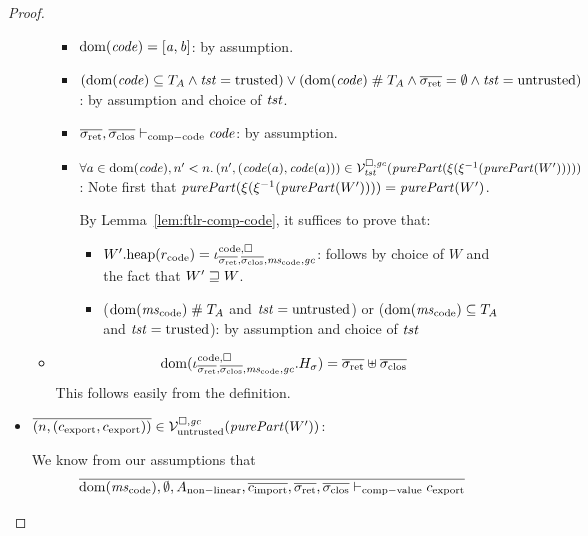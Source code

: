 \documentclass[a4paper]{article}
\begin{document}
\begin{proof}
\begin{itemize}
\begin{itemize}
      \begin{itemize}
      \item $\mathrm{dom}(\mathit{code}) = [\mathit{a},\mathit{b}]$: by assumption.
      \item $(\dom(\code) \subseteq \ta \wedge \trust = \trusted) \vee (\dom(\code)\mathrel{\#} \ta \wedge \sigrets = \emptyset \wedge \trust =\untrusted)$: by assumption and choice of $\mathit{tst}$.
      \item $\sigrets,\sigcloss \vdash_{\mathrm{comp-code}} \code$: by assumption.
      \item $\forall a \in \dom(\code), n' < n \ldotp \npair[n']{(\code(a),\code(a))} \in \lrvg{\trust}(\purePart{}(\xi(\xi^{-1}(\purePart{W'}))))$:
        Note first that $\purePart{}(\xi(\xi^{-1}(\purePart{W'}))) =\purePart{W'}$.

        By Lemma~\ref{lem:ftlr-comp-code}, it suffices to prove that:
        \begin{itemize}
        \item $\pwheap[W'](r_{\mathrm{code}}) = \codereg{\sigrets,\sigcloss,\mscode,\gc}$: follows by choice of $W$ and the fact that $W' \sqsupseteq W$.
        \item ($\dom(\mscode) \mathrel{\#} \ta$ and $\mathit{tst} = \mathrm{untrusted}$) or ($\dom(\mscode) \subseteq \ta$ and $\mathit{tst} = \mathrm{trusted}$): by assumption and choice of $\mathit{tst}$
        \end{itemize}
      \end{itemize}
    \item
      \begin{equation*}
        \dom(\codereg[\mathrm{code},\square]{\sigrets,\sigcloss,\mscode,\gc}.H_\sigma) = \sigrets\uplus \sigcloss
      \end{equation*}
      This follows easily from the definition.
  \end{itemize}
  \item $\overline{\npair{(c_{\mathrm{export}},c_{\mathrm{export}})}} \in \lrv(\purePart{W'})$:

    We know from our assumptions that
    \begin{equation*}
      \overline{\dom(\mscode), \emptyset, A_{\mathrm{non-linear}}, \overline{c_{\mathrm{import}}}, \sigrets,\sigcloss \vdash_{\mathrm{comp-value}} c_{\mathrm{export}}}
    \end{equation*}


\end{itemize}
\end{proof}
\end{document}
